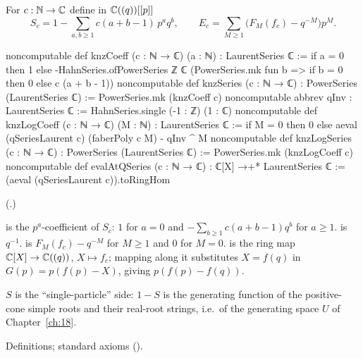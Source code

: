 \begin{definition}\label{ch19:def:knz}
For $c:{\mathbb{N}}\to{\mathbb{C}}$ define in ${\mathbb{C}}((q))[[p]]$
\begin{equation*}
  S_c=1-\sum_{a,b\ge1}c(a+b-1)\,p^aq^b,\qquad E_c=\sum_{M\ge1}\bigl(F_M(f_c)-q^{-M}\bigr)p^M .
\end{equation*}
\end{definition}
\begin{leancode}
noncomputable def knzCoeff (c : ℕ → ℂ) (a : ℕ) : LaurentSeries ℂ :=
  if a = 0 then 1 else
    -HahnSeries.ofPowerSeries ℤ ℂ (PowerSeries.mk fun b => if b = 0 then 0 else c (a + b - 1))
noncomputable def knzSeries (c : ℕ → ℂ) : PowerSeries (LaurentSeries ℂ) :=
  PowerSeries.mk (knzCoeff c)
noncomputable abbrev qInv : LaurentSeries ℂ := HahnSeries.single (-1 : ℤ) (1 : ℂ)
noncomputable def knzLogCoeff (c : ℕ → ℂ) (M : ℕ) : LaurentSeries ℂ :=
  if M = 0 then 0 else aeval (qSeriesLaurent c) (faberPoly c M) - qInv ^ M
noncomputable def knzLogSeries (c : ℕ → ℂ) : PowerSeries (LaurentSeries ℂ) :=
  PowerSeries.mk (knzLogCoeff c)
noncomputable def evalAtQSeries (c : ℕ → ℂ) : ℂ[X] →+* LaurentSeries ℂ :=
  (aeval (qSeriesLaurent c)).toRingHom
\end{leancode}
(.)
\begin{dictionary}
 is the $p^a$-coefficient of $S_c$: $1$ for $a=0$ and $-\sum_{b\ge1}c(a+b-1)q^b$ for $a\ge1$.
 is $q^{-1}$.   is $F_M(f_c)-q^{-M}$ for $M\ge1$ and $0$ for $M=0$.  
is the ring map ${\mathbb{C}}[X]\to{\mathbb{C}}((q))$, $X\mapsto f_c$; mapping  along it substitutes $X=f(q)$ in
$G(p)=p(f(p)-X)$, giving $p(f(p)-f(q))$.
\end{dictionary}
\begin{physics}
$S$ is the ``single-particle'' side: $1-S$ is the generating function of the positive-cone simple roots and their
real-root strings, i.e.\ of the generating space $U$ of Chapter~\ref{ch:18}.
\end{physics}
\begin{status}Definitions; standard axioms ().\end{status}

